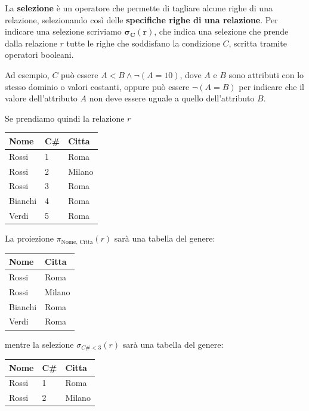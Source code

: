 \documentclass[11pt, a4paper, titlepage, oneside]{scrbook}
\begin{document}
\begin{Definizione}[Selezione]
\label{def-selezione}
La \textbf{selezione} è un operatore che permette di tagliare alcune righe di una relazione, selezionando così delle \textbf{specifiche righe di una relazione}. Per indicare una selezione scriviamo $\bm{\sigma_C(r)}$, che indica una selezione che prende dalla relazione $r$ tutte le righe che soddisfano la condizione $C$, scritta tramite operatori booleani.
\end{Definizione}

Ad esempio, $C$ può essere $A < B \land \neg (A = 10)$, dove $A$ e $B$ sono attributi con lo stesso dominio o valori costanti, oppure può essere $\neg (A = B)$ per indicare che il valore dell'attributo $A$ non deve essere uguale a quello dell'attributo $B$.

Se prendiamo quindi la relazione $r$

\begin{center}
\begin{tabular}{|l|l|l|}
\hline
\textbf{Nome} & \textbf{C\#} & \textbf{Citta} \\ \hline
Rossi   & 1 & Roma   \\
Rossi   & 2 & Milano \\
Rossi   & 3 & Roma   \\
Bianchi & 4 & Roma   \\
Verdi   & 5 & Roma   \\ \hline
\end{tabular}
\end{center}

La proiezione $\pi_{\text{Nome, Citta}}(r)$ sarà una tabella del genere:
\begin{center}
\begin{tabular}{|l|l|}
\hline
\textbf{Nome} & \textbf{Citta} \\ \hline
Rossi   & Roma  \\
Rossi   & Milano\\
Bianchi & Roma   \\
Verdi   & Roma   \\ \hline
\end{tabular}
\end{center}

mentre la selezione $\sigma_{C\# < 3}(r)$ sarà una tabella del genere:
\begin{center}
\begin{tabular}{|l|l|l|}
\hline
\textbf{Nome} & \textbf{C\#} & \textbf{Citta} \\ \hline
Rossi   & 1 & Roma   \\
Rossi   & 2 & Milano \\ \hline
\end{tabular}
\end{center}
\end{document}

